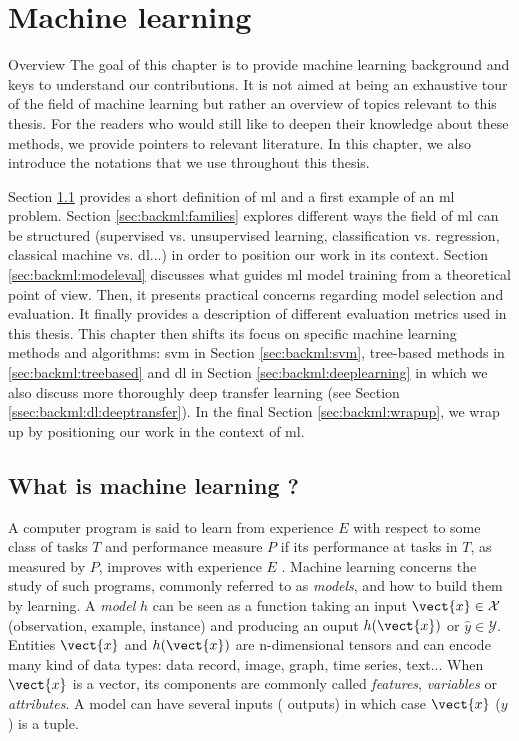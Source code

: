 \chapter{Machine learning}
\label{chap:backml}

\begin{overview}{Overview}
The goal of this chapter is to provide machine learning background and keys to understand our contributions. It is not aimed at being an exhaustive tour of the field of machine learning but rather an overview of topics relevant to this thesis. For the readers who would still like to deepen their knowledge about these methods, we provide pointers to relevant literature. In this chapter, we also introduce the notations that we use throughout this thesis.

Section \ref{sec:backml:whatisml} provides a short definition of \acrlong{ml} and a first example of an \acrshort{ml} problem. Section \ref{sec:backml:families} explores different ways the field of \acrlong{ml} can be structured (\eg supervised vs. unsupervised learning, classification vs. regression, classical machine vs. \acrlong{dl}...) in order to position our work in its context. Section \ref{sec:backml:modeleval} discusses what guides \acrlong{ml} model training from a theoretical point of view. Then, it presents practical concerns regarding model selection and evaluation. It finally provides a description of different evaluation metrics used in this thesis. This chapter then shifts its focus on specific machine learning methods and algorithms: \acrlong{svm} in Section \ref{sec:backml:svm}, tree-based methods in \ref{sec:backml:treebased} and \acrlong{dl} in Section \ref{sec:backml:deeplearning} in which we also discuss more thoroughly deep transfer learning (see Section \ref{ssec:backml:dl:deeptransfer}). In the final Section \ref{sec:backml:wrapup}, we wrap up by positioning our work in the context of \acrlong{ml}.
\end{overview}

\section{What is machine learning ?}
\label{sec:backml:whatisml}

A computer program is said to learn from experience $E$ with respect to some class
of tasks $T$ and performance measure $P$ if its performance at tasks in $T$, as
measured by $P$, improves with experience $E$ \cite{mitchell1997machine}.
Machine learning concerns the study of such programs, commonly referred to as
\textit{models}, and how to build them by learning. A \textit{model} $h$ can be
seen as a function taking an input $\vect{x} \in \mathcal{X}$ (\aka observation,
example, instance) and producing an ouput $h(\vect{x})$ or $\hat{y} \in \mathcal{Y}$.
Entities $\vect{x}$ and $h(\vect{x})$ are n-dimensional tensors and can encode
many kind of data types: data record, image, graph, time series, text... When
$\vect{x}$ is a vector, its components are commonly called \textit{features},
\textit{variables} or \textit{attributes}. A model can have several inputs (\resp
outputs) in which case $\vect{x}$ (\resp $y$) is a tuple. 

